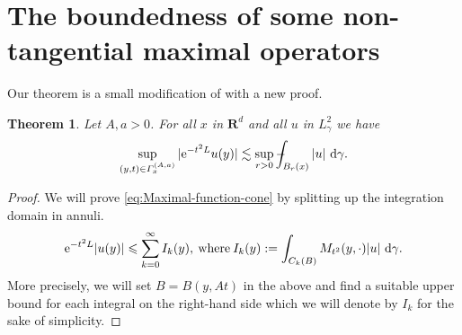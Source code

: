 \documentclass[a4paper,oneside,10pt]{amsproc}
\theoremstyle{plain}
\newtheorem{theorem}{Theorem}
\theoremstyle{remark}
\theoremstyle{definition}
\newcommand{\D}{\,\textup{d}}
\newcommand{\LHG}{{L^2_\gamma}}
\def\Xint#1{\mathchoice
  {\XXint\displaystyle\textstyle{#1}}%
  {\XXint\textstyle\scriptstyle{#1}}%
  {\XXint\scriptstyle\scriptscriptstyle{#1}}%
  {\XXint\scriptscriptstyle\scriptscriptstyle{#1}}%
  \!\int}
\def\XXint#1#2#3{{\setbox0=\hbox{$#1{#2#3}{\int}$ }
    \vcenter{\hbox{$#2#3$ }}\kern-.535\wd0}}
\def\dashint{\Xint-}
\renewcommand{\leq}{\leqslant}
\renewcommand{\leq}{\leqslant}
\newcommand{\R}{\mathbf R}
\newcommand{\e}{\mathrm{e}} %
\renewcommand{\leq}{\leqslant}%
\begin{document}
\section{The boundedness of some non-tangential maximal operators}
Our theorem is a small modification of \cite[lemma 1.1]{Pineda2008} with a new proof.
\begin{theorem}\label{lem:Maximal-function-cone}
  Let $A, a > 0$. For all $x$ in $\R^d$ and all $u$ in $\LHG$ we have
  \begin{equation}
    \label{eq:Maximal-function-cone}
    \sup_{(y, t) \in \Gamma_x^{(A, a)}} |\e^{-t^2 L} u(y)| \lesssim
    \sup_{r > 0} \dashint_{B_r(x)} |u| \, \D\gamma.
  \end{equation}
\end{theorem}
\begin{proof}
  We will prove \eqref{eq:Maximal-function-cone} by splitting up the
  integration domain in annuli.
  \begin{equation*}
    \e^{-t^2 L} |u(y)| \leq \sum_{k = 0}^\infty I_k(y),
    \:\text{where}\: I_k(y) := \int_{C_k(B)} M_{t^2}(y,
    \cdot) |u| \,\D\gamma.
  \end{equation*}
  More precisely, we will set $B = B(y, At)$ in the above and find a
  suitable upper bound for each integral on the right-hand side which
  we will denote by $I_k$ for the sake of simplicity.


\end{proof}
\end{document}
